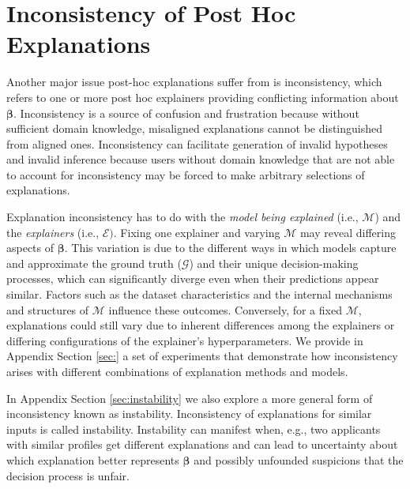 \documentclass[mnsc,blindrev]{informs3}
\begin{document}
\section{Inconsistency of Post Hoc Explanations}
    \label{sec:inconsistency}
    Another major issue post-hoc explanations  suffer from is inconsistency, which refers to one or more post hoc explainers providing conflicting information about $\boldsymbol{\beta}$. Inconsistency is a source of confusion and frustration because without sufficient domain knowledge, misaligned explanations cannot be distinguished from aligned ones.  Inconsistency can facilitate generation of invalid hypotheses and invalid inference because users without domain knowledge that are not able to account for inconsistency may be forced to make arbitrary selections of explanations.

    Explanation inconsistency has to do with the \textit{model being explained} (i.e., $\mathcal{M}$) and the \textit{explainers} (i.e., $\mathcal{E})$. Fixing one explainer and varying $\mathcal{M}$  may reveal differing aspects of $\boldsymbol{\beta}$. This variation is due to the different ways in which models capture and approximate the ground truth ($\mathcal{G}$) and their unique decision-making processes, which can significantly diverge even when their predictions appear similar. Factors such as the dataset characteristics and the internal mechanisms and structures of $\mathcal{M}$ influence these outcomes. Conversely, for a fixed $\mathcal{M}$, explanations could still vary due to  inherent differences among the explainers  or differing configurations of the explainer's hyperparameters. We provide in Appendix Section \ref{sec:} a set of experiments that demonstrate how inconsistency arises with different combinations of explanation methods and models.

    In Appendix Section \ref{sec:instability} we also explore a more general form of inconsistency known as instability. Inconsistency of explanations for similar inputs is called instability. Instability can manifest when, e.g., two applicants with similar profiles get different explanations and can lead to uncertainty about which explanation better represents $\boldsymbol{\beta}$ and possibly unfounded suspicions that the decision process is unfair. 
\end{document}
